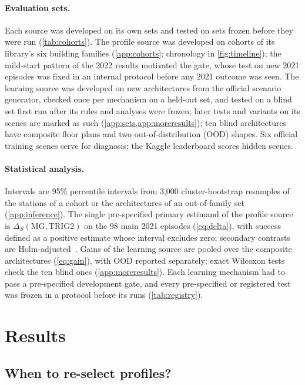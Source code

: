 \documentclass{article}
\begin{document}
\paragraph{Evaluation sets.}
Each source was developed on its own sets and tested on sets frozen before they were run (\cref{tab:cohorts}). The profile
source was developed on cohorts of its library's six building families (\cref{app:cohorts}; chronology in
\cref{fig:timeline}); the mild-start pattern of the 2022 results motivated the gate, whose test on new 2021 episodes
was fixed in an internal protocol before any 2021 outcome was seen. The learning source was
developed on new architectures from the official scenario generator, checked once per mechanism on a held-out set,
and tested on a blind set first run after its rules and analyses were frozen; later tests and variants on its
scenes are marked as such (\cref{app:sets,app:moreresults}); ten blind architectures have composite floor plans and two out-of-distribution (OOD) shapes. Six
official training scenes serve for diagnosis; the Kaggle leaderboard scores hidden scenes.

\paragraph{Statistical analysis.}
Intervals are 95\% percentile intervals from 3,000 cluster-bootstrap resamples of the stations of a cohort or the
architectures of an out-of-family set (\cref{app:inference}). The single pre-specified primary estimand of the profile source is
$\Delta_S(\mathrm{MG},\mathrm{TRIG2})$ on the 98 main 2021 episodes (\cref{eq:delta}), with success defined as a positive
estimate whose interval excludes zero; secondary contrasts are Holm-adjusted~\cite{holm1979}. Gains of the learning
source are pooled over the composite architectures (\cref{eq:gain}), with OOD reported separately; exact Wilcoxon tests check the ten blind ones (\cref{app:moreresults}). Each learning
mechanism had to pass a pre-specified development gate, and every pre-specified or registered test was frozen in a
protocol before its runs (\cref{tab:registry}).

\section{Results}\label{sec:results}
\subsection{When to re-select profiles?}\label{sec:reselect}
\end{document}
